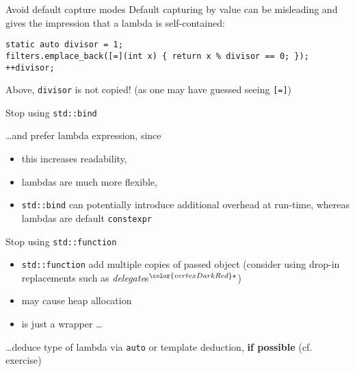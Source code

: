 \begin{frame}[fragile]{Avoid default capture modes}
    Default capturing by value can be misleading and gives the impression that a lambda is self-contained:
    \begin{lstlisting}
static auto divisor = 1;
filters.emplace_back([=](int x) { return x % divisor == 0; });
++divisor;
    \end{lstlisting}
    Above, \texttt{divisor} is not copied! (as one may have guessed seeing \texttt{[=]})
\end{frame}

\begin{frame}[fragile]{Stop using \texttt{std::bind}}

    \ldots and prefer lambda expression, since
    \begin{itemize}
        \item this increases readability,
        \item lambdas are much more flexible,
        \item \texttt{std::bind} can potentially introduce additional overhead at run-time, whereas lambdas are default \texttt{constexpr}
    \end{itemize}
\end{frame}

\begin{frame}[fragile]{Stop using \texttt{std::function}}

    \begin{itemize}
        \item \texttt{std::function} add multiple copies of passed object (consider using drop-in replacements such as \textit{delegate}s${}^{\color{vertexDarkRed}\star}$)
        \item may cause heap allocation
        \item is just a wrapper \ldots
    \end{itemize}
    \ldots deduce type of lambda via \texttt{auto} or template deduction, \textbf{if possible} (cf. exercise)

    \vspace{5mm}

    
\end{frame}
